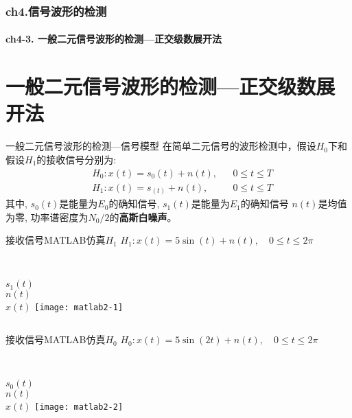 \begin{frame}[shrink]
  \frametitle{ch4.信号波形的检测}
  \framesubtitle{ch4-3. 一般二元信号波形的检测---正交级数展开法}
  \tableofcontents[hideallsubsections]
\end{frame}

\section{一般二元信号波形的检测---正交级数展开法}

\begin{frame}{一般二元信号波形的检测---信号模型}
在简单二元信号的波形检测中，假设$H_0$下和假设$H_1$的接收信号分别为:
\begin{align*}
&H_0: x(t)=s_0(t)+n(t), &&0\le t\le T\\
&H_1: x(t)=s_(t)+n(t), &&0\le t\le T
\end{align*}
其中, $s_0(t)$是能量为$E_0$的确知信号, $s_1(t)$是能量为$E_1$的确知信号
$n(t)$是均值为零, 功率谱密度为$N_0/2$的\textbf{高斯白噪声}。
\end{frame}

\begin{frame}[shrink]{接收信号MATLAB仿真$H_1$}
$H_1: x(t)=5\sin(t)+n(t),\quad 0 \le t\le 2\pi $\\
\vspace{0.5cm}
\begin{columns}%
~\\
\vspace{0.5cm}
$s_1(t)$\\
\vspace{0.7cm}
$n(t)$\\
\vspace{0.7cm}
$x(t)$
\texttt{[image: matlab2-1]}
\end{columns}
\end{frame}

\begin{frame}[shrink]{接收信号MATLAB仿真$H_0$}
$H_0: x(t)=5\sin(2t)+n(t),\quad 0 \le t\le 2\pi $\\
\vspace{1.8cm}
\begin{columns}%
	~\\
	$s_0(t)$\\
	\vspace{1cm}
	$n(t)$\\
	\vspace{1.5cm}
	$x(t)$
	\texttt{[image: matlab2-2]}
\end{columns}
\end{frame}

